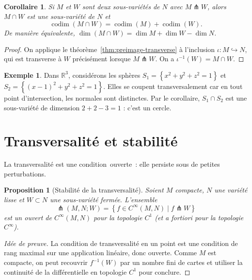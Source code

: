 \documentclass[12pt,a4paper,openany]{book}
\theoremstyle{definition}
\newtheorem{exemple}[definition]{Exemple}
\theoremstyle{plain}
\newtheorem{proposition}[definition]{Proposition}
\newtheorem{corollaire}[definition]{Corollaire}
\theoremstyle{remark}
\newcommand{\R}{\mathbb{R}}
\newcommand{\set}[1]{\left\{#1\right\}}
\providecommand{\og}{\guillemotleft\,}
\providecommand{\fg}{\,\guillemotright}
\begin{document}
\begin{corollaire}\label{cor:transverse-sous-varietes}%
Si $M$ et $W$ sont deux sous-variétés de $N$ avec $M \pitchfork W$,
alors $M \cap W$ est une sous-variété de $N$ et
\[
  \operatorname{codim}(M \cap W) = \operatorname{codim}(M) +
    \operatorname{codim}(W).
\]
De manière équivalente,
$\dim(M \cap W) = \dim M + \dim W - \dim N$.
\end{corollaire}

\begin{proof}
On applique le théorème~\ref{thm:preimage-transverse} à l'inclusion
$\iota \colon M \hookrightarrow N$, qui est transverse à $W$
précisément lorsque $M \pitchfork W$. On a
$\iota^{-1}(W) = M \cap W$.
\end{proof}

\begin{exemple}\label{ex:intersection-spheres}
Dans $\R^3$, considérons les sphères
$S_1 = \set{x^2 + y^2 + z^2 = 1}$ et
$S_2 = \set{(x-1)^2 + y^2 + z^2 = 1}$. Elles se coupent
transversalement car en tout point d'intersection, les normales sont
distinctes. Par le corollaire, $S_1 \cap S_2$ est une sous-variété de
dimension $2 + 2 - 3 = 1$ : c'est un cercle.
\end{exemple}

\section{Transversalité et stabilité}\label{sec:stabilite-transversalite}

La transversalité est une condition \og{}ouverte\fg{} : elle persiste
sous de petites perturbations.

\begin{proposition}[Stabilité de la transversalité]%
\label{prop:stabilite-transversalite}
Soient $M$ compacte, $N$ une variété lisse et $W \subset N$ une
sous-variété fermée. L'ensemble
\[
  \pitchfork(M, N; W) = \set{f \in C^\infty(M, N) \mid f \pitchfork W}
\]
est un ouvert de $C^\infty(M, N)$ pour la topologie $C^1$ (et a fortiori
pour la topologie $C^\infty$).
\end{proposition}

\begin{proof}[Idée de preuve]
La condition de transversalité en un point est une condition de rang
maximal sur une application linéaire, donc ouverte. Comme $M$ est
compacte, on peut recouvrir $f^{-1}(W)$ par un nombre fini de cartes et
utiliser la continuité de la différentielle en topologie $C^1$ pour
conclure.
\end{proof}
\end{document}
